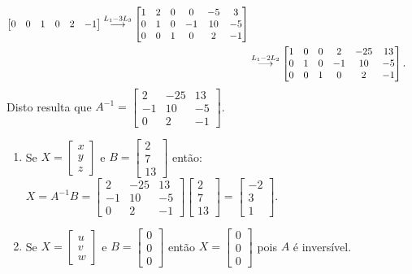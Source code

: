 \documentclass[12pt,a4paper]{article}
\newcommand{\grstep}[2][\relax]{%
   \ensuremath{\mathrel{
       {\mathop{\longrightarrow}\limits^{#2\mathstrut}_{
                                     \begin{subarray}{l} #1 \end{subarray}}}}}}
\begin{document}
\begin{enumerate}
\begin{align*}
\begin{bmatrix}
0 & 0 & 1 & 0 & 2 & -1
\end{bmatrix}
\grstep{ L_1-3L_3 }
\begin{bmatrix}
1 & 2 & 0 & 0 & -5 & 3\\
0 & 1 & 0 & -1 & 10 & -5\\
0 & 0 & 1 & 0 & 2 & -1
\end{bmatrix} \\
&
\grstep{ L_1-2L_2 }
\begin{bmatrix}
1 & 0 & 0 & 2 & -25 & 13\\
0 & 1 & 0 & -1 & 10 & -5\\
0 & 0 & 1 & 0 & 2 & -1
\end{bmatrix}.
\end{align*}
Disto resulta que $A^{-1} = \begin{bmatrix}
 2 & -25 & 13\\
-1 &  10 & -5\\
 0 & 2 & -1
\end{bmatrix}$.

\begin{enumerate}
\item Se $X = \begin{bmatrix}
x\\
y\\
z
\end{bmatrix}$ e $B = \begin{bmatrix}
2\\
7\\
13
\end{bmatrix}$ então:
$
X
= A^{-1} B
=
\begin{bmatrix}
 2 & -25 & 13\\
-1 &  10 & -5\\
 0 & 2 & -1
\end{bmatrix}
\begin{bmatrix}
2\\
7\\
13
\end{bmatrix}
=
\begin{bmatrix}
-2\\
3\\
1
\end{bmatrix}.
$

\item Se $X = \begin{bmatrix}
u\\
v\\
w
\end{bmatrix}$ e $B = \begin{bmatrix}
0\\
0\\
0
\end{bmatrix}$ então $X = \begin{bmatrix}
0\\
0\\
0
\end{bmatrix}$ pois $A$ é inversível.


\end{enumerate}
\end{enumerate}
\end{document}
